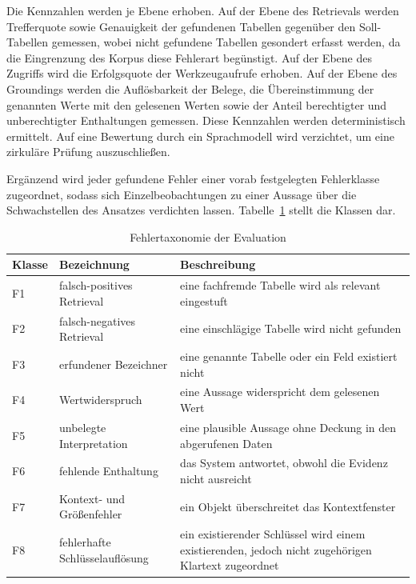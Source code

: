 Die Kennzahlen werden je Ebene erhoben. Auf der Ebene des Retrievals werden Trefferquote sowie Genauigkeit der gefundenen Tabellen gegenüber den Soll-Tabellen gemessen, wobei nicht gefundene Tabellen gesondert erfasst werden, da die Eingrenzung des Korpus diese Fehlerart begünstigt. Auf der Ebene des Zugriffs wird die Erfolgsquote der Werkzeugaufrufe erhoben. Auf der Ebene des Groundings werden die Auflösbarkeit der Belege, die Übereinstimmung der genannten Werte mit den gelesenen Werten sowie der Anteil berechtigter und unberechtigter Enthaltungen gemessen. Diese Kennzahlen werden deterministisch ermittelt. Auf eine Bewertung durch ein Sprachmodell wird verzichtet, um eine zirkuläre Prüfung auszuschließen.

Ergänzend wird jeder gefundene Fehler einer vorab festgelegten Fehlerklasse zugeordnet, sodass sich Einzelbeobachtungen zu einer Aussage über die Schwachstellen des Ansatzes verdichten lassen. Tabelle~\ref{tab:fehlerklassen} stellt die Klassen dar.

\begin{table}[htbp]
\centering
\caption{Fehlertaxonomie der Evaluation}
\label{tab:fehlerklassen}
\small
\begin{tabular}{p{1.3cm}p{4.0cm}p{7.0cm}}
\toprule
\textbf{Klasse} & \textbf{Bezeichnung} & \textbf{Beschreibung} \\
\midrule
F1 & falsch-positives Retrieval & eine fachfremde Tabelle wird als relevant eingestuft \\
F2 & falsch-negatives Retrieval & eine einschlägige Tabelle wird nicht gefunden \\
F3 & erfundener Bezeichner & eine genannte Tabelle oder ein Feld existiert nicht \\
F4 & Wertwiderspruch & eine Aussage widerspricht dem gelesenen Wert \\
F5 & unbelegte Interpretation & eine plausible Aussage ohne Deckung in den abgerufenen Daten \\
F6 & fehlende Enthaltung & das System antwortet, obwohl die Evidenz nicht ausreicht \\
F7 & Kontext- und Größenfehler & ein Objekt überschreitet das Kontextfenster \\
F8 & fehlerhafte Schlüsselauflösung & ein existierender Schlüssel wird einem existierenden, jedoch nicht zugehörigen Klartext zugeordnet \\
\bottomrule
\end{tabular}
\end{table}

